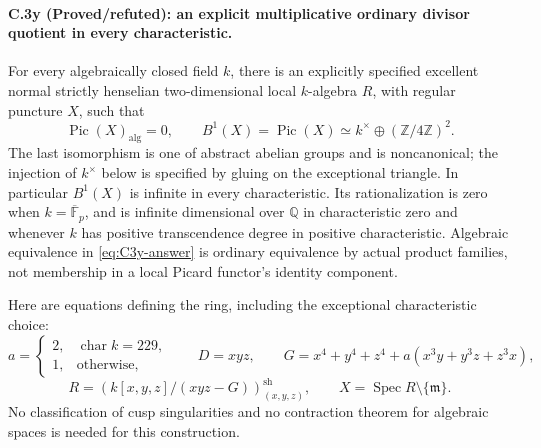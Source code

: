 \paragraph{C.3y (Proved/refuted): an explicit multiplicative ordinary divisor quotient in every characteristic.}
For every algebraically closed field $k$, there is an explicitly
specified excellent normal strictly henselian two-dimensional local
$k$-algebra $R$, with regular puncture $X$, such that
\begin{equation}\label{eq:C3y-answer}
 \operatorname{Pic}(X)_{\mathrm{alg}}=0,
 \qquad
 B^1(X)=\operatorname{Pic}(X)
       \simeq k^\times\oplus(\mathbb Z/4\mathbb Z)^2.
\end{equation}
The last isomorphism is one of abstract abelian groups and is
noncanonical; the injection of $k^\times$ below is specified by
gluing on the exceptional triangle. In particular $B^1(X)$ is
infinite in every characteristic. Its rationalization is zero
when $k=\overline{\mathbb F}_p$, and is infinite dimensional over
$\mathbb Q$ in characteristic zero and whenever $k$ has positive
transcendence degree in positive characteristic. Algebraic
equivalence in \eqref{eq:C3y-answer} is ordinary equivalence by
actual product families, not membership in a local Picard
functor's identity component.

Here are equations defining the ring, including the exceptional
characteristic choice:
\[
 a=\begin{cases}2,&\operatorname{char}k=229,\\1,&\text{otherwise},\end{cases}
 \qquad
 D=xyz,\qquad
 G=x^4+y^4+z^4+a(x^3y+y^3z+z^3x),
\]
\begin{equation}\label{eq:C3y-ring}
 R=\left(k[x,y,z]/(xyz-G)\right)_{(x,y,z)}^{\mathrm{sh}},
 \qquad
 X=\operatorname{Spec}R\setminus\{\mathfrak m\}.
\end{equation}
No classification of cusp singularities and no contraction
theorem for algebraic spaces is needed for this construction.

